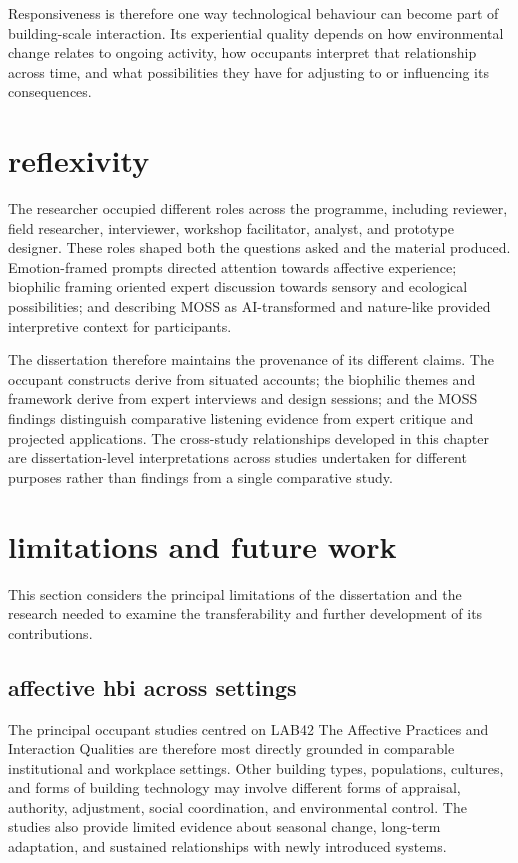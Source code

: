 Responsiveness is therefore one way technological behaviour can become
part of building-scale interaction. Its experiential quality depends
on how environmental change relates to ongoing activity, how occupants
interpret that relationship across time, and what possibilities they
have for adjusting to or influencing its consequences.


\section{reflexivity}
\label{sec:reflexivity}

The researcher occupied different roles across the programme,
including reviewer, field researcher, interviewer, workshop
facilitator, analyst, and prototype designer. These roles shaped both
the questions asked and the material produced. Emotion-framed prompts
directed attention towards affective experience; biophilic framing
oriented expert discussion towards sensory and ecological
possibilities; and describing MOSS as AI-transformed and nature-like
provided interpretive context for participants.

The dissertation therefore maintains the provenance of its different
claims. The occupant constructs derive from situated accounts; the
biophilic themes and framework derive from expert interviews and design
sessions; and the MOSS findings distinguish comparative listening
evidence from expert critique and projected applications. The
cross-study relationships developed in this chapter are
dissertation-level interpretations across studies undertaken for
different purposes rather than findings from a single comparative
study.

\section{limitations and future work}
\label{sec:limitations-future}

This section considers the principal limitations of the dissertation and the research needed to examine the transferability and further development of its contributions.


\subsection{affective hbi across settings}
\label{subsec:limitations-affective}

The principal occupant studies centred on LAB42%
The Affective Practices and Interaction Qualities are therefore most
directly grounded in comparable institutional and workplace settings.
Other building types, populations, cultures, and forms of building
technology may involve different forms of appraisal, authority,
adjustment, social coordination, and environmental control. The studies
also provide limited evidence about seasonal change, long-term
adaptation, and sustained relationships with newly introduced systems.

